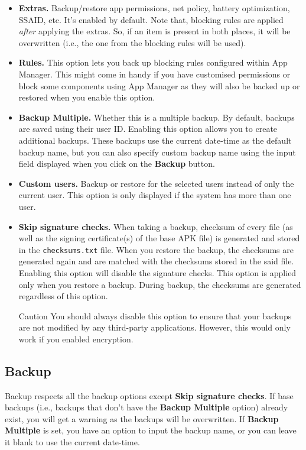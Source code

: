 \begin{itemize}
    \item \textbf{Extras.} Backup/restore app permissions, net policy, battery optimization, SSAID, etc. It's enabled
    by default. Note that, blocking rules are applied \textit{after} applying the extras. So, if an item is present in
    both places, it will be overwritten (i.e., the one from the blocking rules will be used).

    \item \textbf{Rules.} This option lets you back up blocking rules configured within App Manager. This might come in
    handy if you have customised permissions or block some components using App Manager as they will also be backed up
    or restored when you enable this option.

    \item \textbf{Backup Multiple.} Whether this is a multiple backup. By default, backups are saved using their user
    ID. Enabling this option allows you to create additional backups. These backups use the current date-time as the
    default backup name, but you can also specify custom backup name using the input field displayed when you click on
    the \textbf{Backup} button.

    \item \textbf{Custom users.} Backup or restore for the selected users instead of only the current user. This option
    is only displayed if the system has more than one user.

    \item \textbf{Skip signature checks.} When taking a backup, checksum of every file (as well as the signing
    certificate(s) of the base APK file) is generated and stored in the \texttt{checksums.txt} file. When you restore
    the backup, the checksums are generated again and are matched with the checksums stored in the said file. Enabling
    this option will disable the signature checks. This option is applied only when you restore a backup. During backup,
    the checksums are generated regardless of this option.
    \begin{warning}{Caution}
        You should always disable this option to ensure that your backups are not modified by any third-party
        applications. However, this would only work if you enabled encryption.
    \end{warning}
\end{itemize}

\subsection{Backup}\label{subsec:backup-restore-backup}
Backup respects all the backup options except \textbf{Skip signature checks}. If base backups (i.e., backups that don't
have the \textbf{Backup Multiple} option) already exist, you will get a warning as the backups will be overwritten. If
\textbf{Backup Multiple} is set, you have an option to input the backup name, or you can leave it blank to use the
current date-time.

